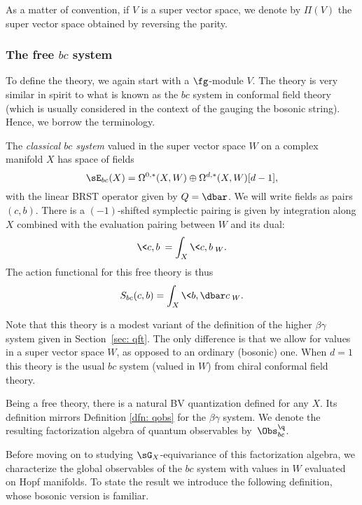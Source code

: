 \begin{rmk}
As a matter of convention, if $V$ is a super vector space, we denote by $\Pi(V)$ the super vector space obtained by reversing the parity. 
\end{rmk}

\subsubsection{The free $bc$ system}

To define the theory, we again start with a $\fg$-module $V$.
The theory is very similar in spirit to what is known as the $bc$ system in conformal field theory (which is usually considered in the context of the gauging the bosonic string). 
Hence, we borrow the terminology. 

\begin{dfn}
The {\em classical $bc$ system} valued in the super vector space $W$ on a complex manifold $X$ has space of fields
\[
\sE_{bc} (X) = \Omega^{0,*}(X , W) \oplus \Omega^{d,*}(X , W)[d-1],
\]
with the linear BRST operator given by $Q = \dbar$.
We will write fields as pairs $(c,b)$. 
There is a $(-1)$-shifted symplectic pairing is given by integration along $X$ combined with the evaluation pairing between $W$ and its dual: 
\[
\<c,b\> = \int_X \<c, b\>_{W}.
\] 
The action functional for this free theory is thus
\[
S_{bc} (c,b) = \int_X \<b , \dbar c\>_{W} .
\]
\end{dfn}

\begin{rmk}
Note that this theory is a modest variant of the definition of the higher $\beta\gamma$ system given in Section~\ref{sec: qft}. 
The only difference is that we allow for values in a super vector space $W$, as opposed to an ordinary (bosonic) one. 
When $d=1$ this theory is the usual $bc$ system (valued in $W$) from chiral conformal field theory.
\end{rmk}

Being a free theory, there is a natural BV quantization defined for any $X$.
Its definition mirrors Definition \ref{dfn: qobs} for the $\beta\gamma$ system. 
We denote the resulting factorization algebra of quantum observables by~$\Obs^\q_{bc}$. 

Before moving on to studying $\sG_X$-equivariance of this factorization algebra, we characterize the global observables of the $bc$ system with values in $W$ evaluated on Hopf manifolds. 
To state the result we introduce the following definition, whose bosonic version is familiar. 

